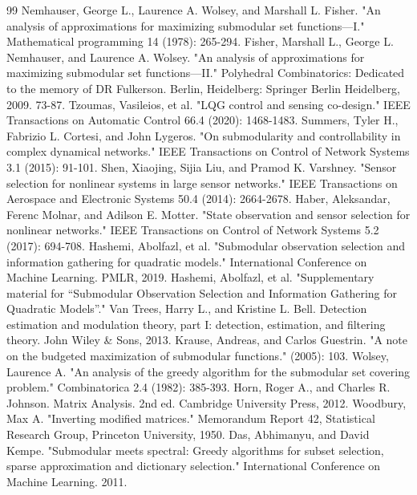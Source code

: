 \documentclass[letterpaper, 10 pt, conference]{ieeeconf}  %
\begin{document}
\begin{thebibliography}{99}
 Nemhauser, George L., Laurence A. Wolsey, and Marshall L. Fisher. "An analysis of approximations for maximizing submodular set functions—I." Mathematical programming 14 (1978): 265-294.
 Fisher, Marshall L., George L. Nemhauser, and Laurence A. Wolsey. "An analysis of approximations for maximizing submodular set functions—II." Polyhedral Combinatorics: Dedicated to the memory of DR Fulkerson. Berlin, Heidelberg: Springer Berlin Heidelberg, 2009. 73-87.
 Tzoumas, Vasileios, et al. "LQG control and sensing co-design." IEEE Transactions on Automatic Control 66.4 (2020): 1468-1483.
 Summers, Tyler H., Fabrizio L. Cortesi, and John Lygeros. "On submodularity and controllability in complex dynamical networks." IEEE Transactions on Control of Network Systems 3.1 (2015): 91-101.
 Shen, Xiaojing, Sijia Liu, and Pramod K. Varshney. "Sensor selection for nonlinear systems in large sensor networks." IEEE Transactions on Aerospace and Electronic Systems 50.4 (2014): 2664-2678.
 Haber, Aleksandar, Ferenc Molnar, and Adilson E. Motter. "State observation and sensor selection for nonlinear networks." IEEE Transactions on Control of Network Systems 5.2 (2017): 694-708.
 Hashemi, Abolfazl, et al. "Submodular observation selection and information gathering for quadratic models." International Conference on Machine Learning. PMLR, 2019.
 Hashemi, Abolfazl, et al. "Supplementary material for “Submodular Observation Selection and Information Gathering for Quadratic Models”."
 Van Trees, Harry L., and Kristine L. Bell. Detection estimation and modulation theory, part I: detection, estimation, and filtering theory. John Wiley & Sons, 2013.
 Krause, Andreas, and Carlos Guestrin. "A note on the budgeted maximization of submodular functions." (2005): 103.
 Wolsey, Laurence A. "An analysis of the greedy algorithm for the submodular set covering problem." Combinatorica 2.4 (1982): 385-393.
 Horn, Roger A., and Charles R. Johnson. Matrix Analysis. 2nd ed. Cambridge University Press, 2012.
 Woodbury, Max A. "Inverting modified matrices." Memorandum Report 42, Statistical Research Group, Princeton University, 1950.
 Das, Abhimanyu, and David Kempe. "Submodular meets spectral: Greedy algorithms for subset selection, sparse approximation and dictionary selection." International Conference on Machine Learning. 2011.
\end{thebibliography}

\end{document}
